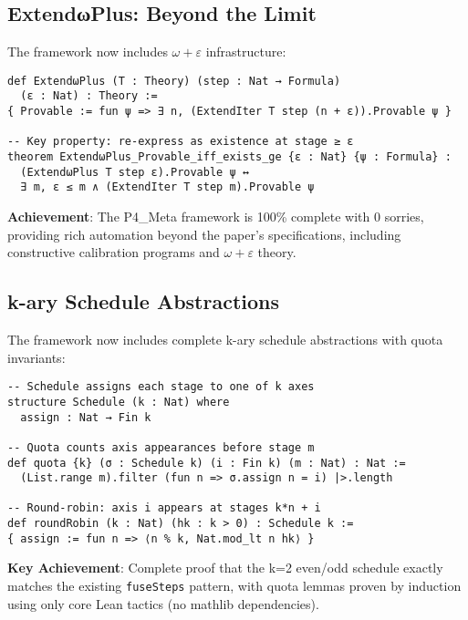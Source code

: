 \documentclass[11pt]{article}
\theoremstyle{definition}
\theoremstyle{remark}
\begin{document}
\subsection{ExtendωPlus: Beyond the Limit}

The framework now includes $\omega+\varepsilon$ infrastructure:

\begin{lstlisting}[language={}]
def ExtendωPlus (T : Theory) (step : Nat → Formula) 
  (ε : Nat) : Theory :=
{ Provable := fun ψ => ∃ n, (ExtendIter T step (n + ε)).Provable ψ }

-- Key property: re-express as existence at stage ≥ ε
theorem ExtendωPlus_Provable_iff_exists_ge {ε : Nat} {ψ : Formula} :
  (ExtendωPlus T step ε).Provable ψ ↔ 
  ∃ m, ε ≤ m ∧ (ExtendIter T step m).Provable ψ
\end{lstlisting}

\begin{mdframed}[style=achievement]
\textbf{Achievement}: The P4\_Meta framework is 100\% complete with 0 sorries, providing rich automation beyond the paper's specifications, including constructive calibration programs and $\omega+\varepsilon$ theory.
\end{mdframed}

\subsection{k-ary Schedule Abstractions}

The framework now includes complete k-ary schedule abstractions with quota invariants:

\begin{lstlisting}[language={}]
-- Schedule assigns each stage to one of k axes
structure Schedule (k : Nat) where
  assign : Nat → Fin k

-- Quota counts axis appearances before stage m  
def quota {k} (σ : Schedule k) (i : Fin k) (m : Nat) : Nat :=
  (List.range m).filter (fun n => σ.assign n = i) |>.length

-- Round-robin: axis i appears at stages k*n + i
def roundRobin (k : Nat) (hk : k > 0) : Schedule k :=
{ assign := fun n => ⟨n % k, Nat.mod_lt n hk⟩ }
\end{lstlisting}

\textbf{Key Achievement}: Complete proof that the k=2 even/odd schedule exactly matches the existing \texttt{fuseSteps} pattern, with quota lemmas proven by induction using only core Lean tactics (no mathlib dependencies).
\end{document}
